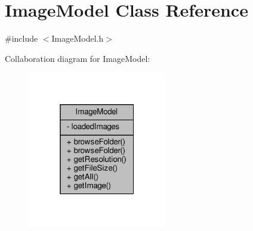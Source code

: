 \hypertarget{classImageModel}{}\section{Image\+Model Class Reference}
\label{classImageModel}


{\ttfamily \#include $<$Image\+Model.\+h$>$}



Collaboration diagram for Image\+Model\+:\nopagebreak
\begin{figure}[H]
\begin{center}
\leavevmode
\includegraphics[width=172pt]{classImageModel__coll__graph}
\end{center}
\end{figure}
